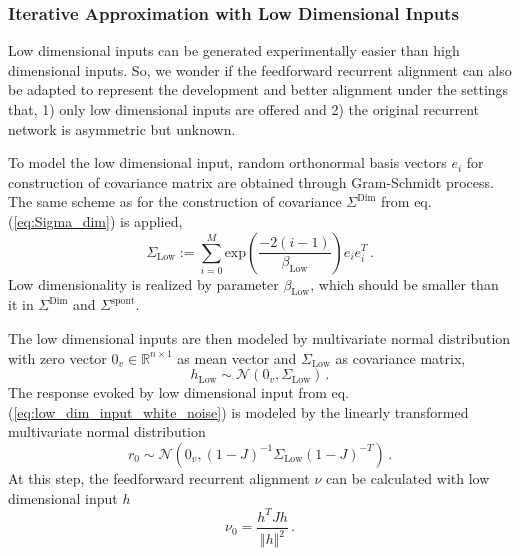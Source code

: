 \documentclass[11pt]{article}
\begin{document}
{	\subsubsection{Iterative Approximation with Low Dimensional Inputs} \label{sec:repeat_low_dim_inputs}
	Low dimensional inputs can be generated experimentally easier than high dimensional inputs. %
	So, we wonder if the feedforward recurrent alignment can also be adapted to represent the development and better alignment under the settings that, 1) only low dimensional inputs are offered and 2) the original recurrent network is asymmetric but unknown.
	
	To model the low dimensional input, random orthonormal basis vectors $e_i$ for construction of covariance matrix are obtained through Gram-Schmidt process. The same scheme as for the construction of covariance $\Sigma^{\text{Dim}}$ from eq.(\ref{eq:Sigma_dim}) is applied, 
		\begin{equation}
			\Sigma_{\text{Low}} := \sum_{i=0}^{M} \text{exp}\left(\frac{-2(i-1)}{\beta_{\text{Low}}}\right) e_i e_i^T \, .
		\end{equation}
	Low dimensionality is realized by parameter $\beta_{\text{Low}}$, which should be smaller than it in $\Sigma^{\text{Dim}}$ and $\Sigma^{\text{spont}}$.
	
	The low dimensional inputs are then modeled by multivariate normal distribution with zero vector $0_v \in \mathbb{R}^{n \times 1}$ as mean vector and $\Sigma_{\text{Low}}$ as covariance matrix, 
		\begin{equation} \label{eq:low_dim_input_white_noise}
			h_{\text{Low}} \sim \mathcal{N}(0_v, \Sigma_{\text{Low}}) \, .
		\end{equation}
	The response evoked by low dimensional input from eq.(\ref{eq:low_dim_input_white_noise}) is modeled by the linearly transformed multivariate normal distribution
		\begin{equation}
			r_0 \sim \mathcal{N}\left( 0_v, (1-J)^{-1} \Sigma_{\text{Low}} (1-J)^{-T} \right) \, .
		\end{equation}
	At this step, the feedforward recurrent alignment $\nu$ can be calculated with low dimensional input $h$ 
		\begin{equation} \label{eq:repeat_low_dim_ffrec}
			\nu_0 = \frac{h^T J h}{\Vert h \Vert^2} \,.
		\end{equation} 
	
}
\end{document}
